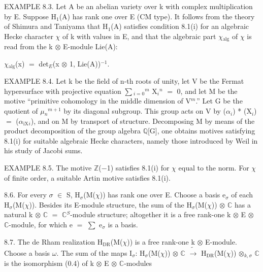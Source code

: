 \documentclass[10pt,twoside]{article}
\begin{document}
EXAMPLE 8.3. Let A be an abelian variety over k with complex multiplication by E. Suppose H\ensuremath{_{1}}(A) has rank one over E (CM type). It follows from the theory of Shimura and Taniyama that H\ensuremath{_{1}}(A) satisfies condition 8.1(i) for an algebraic Hecke character \ensuremath{χ} of k with values in E, and that the algebraic part \ensuremath{χ}\ensuremath{_{\mathrm{alg}}} of \ensuremath{χ} is read from the k \ensuremath{⊗} E-module Lie(A):\par
\ensuremath{χ}\ensuremath{_{\mathrm{alg}}}(x) \ensuremath{=} det\ensuremath{_{E}}(x \ensuremath{⊗} 1, Lie(A))\ensuremath{^{-1}}.\par
EXAMPLE 8.4. Let k be the field of n-th roots of unity, let V be the Fermat hypersurface with projective equation \ensuremath{∑}\ensuremath{_{i=0}}\ensuremath{^{m}} X\ensuremath{_{i}}\ensuremath{^{n}} \ensuremath{=} 0, and let M be the motive “primitive cohomology in the middle dimension of V\ensuremath{^{m}}.” Let G be the quotient of \ensuremath{μ}\ensuremath{_{n}}\ensuremath{^{m+1}} by its diagonal subgroup. This group acts on V by (\ensuremath{α}\ensuremath{_{i}}) * (X\ensuremath{_{i}}) \ensuremath{=} (\ensuremath{α}\ensuremath{_{\mathrm{iX}}}\ensuremath{_{i}}), and on M by transport of structure. Decomposing M by means of the product decomposition of the group algebra \ensuremath{ℚ}[G], one obtains motives satisfying 8.1(i) for suitable algebraic Hecke characters, namely those introduced by Weil in his study of Jacobi sums.\par
EXAMPLE 8.5. The motive \ensuremath{ℤ}(\ensuremath{−}1) satisfies 8.1(i) for \ensuremath{χ} equal to the norm. For \ensuremath{χ} of finite order, a suitable Artin motive satisfies 8.1(i).\par
8.6. For every \ensuremath{σ} \ensuremath{∈} S, H\ensuremath{_{σ}}(M(\ensuremath{χ})) has rank one over E. Choose a basis e\ensuremath{_{σ}} of each H\ensuremath{_{σ}}(M(\ensuremath{χ})). Besides its E-module structure, the sum of the H\ensuremath{_{σ}}(M(\ensuremath{χ})) \ensuremath{⊗} \ensuremath{ℂ} has a natural k \ensuremath{⊗} \ensuremath{ℂ} \ensuremath{=} \ensuremath{ℂ}\ensuremath{^{S}}-module structure; altogether it is a free rank-one k \ensuremath{⊗} E \ensuremath{⊗} \ensuremath{ℂ}-module, for which e \ensuremath{=} \ensuremath{∑} e\ensuremath{_{σ}} is a basis.\par
8.7. The de Rham realization H\ensuremath{_{\mathrm{DR}}}(M(\ensuremath{χ})) is a free rank-one k \ensuremath{⊗} E-module. Choose a basis \ensuremath{ω}. The sum of the maps I\ensuremath{_{σ}}: H\ensuremath{_{σ}}(M(\ensuremath{χ})) \ensuremath{⊗} \ensuremath{ℂ} \ensuremath{\widetilde{→}} H\ensuremath{_{\mathrm{DR}}}(M(\ensuremath{χ})) \ensuremath{⊗}\ensuremath{_{k,σ}} \ensuremath{ℂ} is the isomorphism (0.4) of k \ensuremath{⊗} E \ensuremath{⊗} \ensuremath{ℂ}-modules\par
\end{document}
